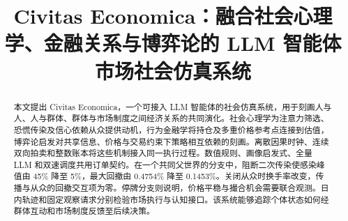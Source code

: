 \documentclass[sigconf,anonymous,review,balance=false]{acmart}
\begin{document}
\title[Civitas Economica：多尺度市场仿真]{Civitas Economica：融合社会心理学、金融关系与博弈论的 LLM 智能体市场社会仿真系统}

\begin{abstract}
本文提出 Civitas Economica，一个可接入 LLM 智能体的社会仿真系统，用于刻画人与人、人与群体、群体与市场制度之间经济关系的共同演化。社会心理学为注意力筛选、恐慌传染及信心依赖从众提供动机，行为金融学将持仓及多重价格参考点连接到估值，博弈论启发对共享信息、价格与交易约束下策略相互依赖的刻画。离散因果时钟、连续双向拍卖和整数账本将这些机制接入同一执行过程。数值规则、画像启发式、全量 LLM 和双速调度共用订单契约。在一个共同父世界的分支中，阻断二次传染使感染峰值由 45\% 降至 5\%，最大回撤由 0.4754\% 降至 0.1453\%。关闭从众时换手率改变，传播与从众的回撤交互项为零。停牌分支则说明，价格平稳与撮合机会需要联合观测。日内轨迹和固定观察请求分别检验市场执行与认知接口。该系统能够追踪个体状态如何经群体互动和市场制度反馈至后续决策。
\end{abstract}


\maketitle








\label{end:maintext}
\FloatBarrier
\label{start:references}



\clearpage

\end{document}
